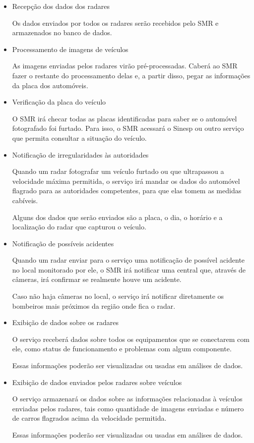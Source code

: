 \begin{itemize}
\item{Recepção dos dados dos radares}

Os dados enviados por todos os radares serão recebidos pelo SMR e armazenados no banco de dados.

\item{Processamento de imagens de veículos}

As imagens enviadas pelos radares virão pré-processadas. Caberá ao SMR fazer o restante do processamento delas e, a partir disso, pegar as informações da placa dos automóveis.

\item{Verificação da placa do veículo}

O SMR irá checar todas as placas identificadas para saber se o automóvel fotografado foi furtado. Para isso, o SMR acessará o Sinesp ou outro serviço que permita consultar a situação do veículo.

\item{Notificação de irregularidades às autoridades}

Quando um radar fotografar um veículo furtado ou que ultrapassou a velocidade máxima permitida, o serviço irá mandar os dados do automóvel flagrado para as autoridades competentes, para que elas tomem as medidas cabíveis.

Alguns dos dados que serão enviados são a placa, o dia, o horário e a localização do radar que capturou o veículo.

\item{Notificação de possíveis acidentes}

Quando um radar enviar para o serviço uma notificação de possível acidente no local monitorado por ele, o SMR irá notificar uma central que, através de câmeras, irá confirmar se realmente houve um acidente.

Caso não haja câmeras no local, o serviço irá notificar diretamente os bombeiros mais próximos da região onde fica o radar.

\item{Exibição de dados sobre os radares}

O serviço receberá dados sobre todos os equipamentos que se conectarem com ele, como status de funcionamento e problemas com algum componente.

Essas informações poderão ser visualizadas ou usadas em análises de dados.

\item{Exibição de dados enviados pelos radares sobre veículos}

O serviço armazenará os dados sobre as informações relacionadas à veículos enviadas pelos radares, tais como quantidade de imagens enviadas e número de carros flagrados acima da velocidade permitida.

Essas informações poderão ser visualizadas ou usadas em análises de dados.
\end{itemize}

